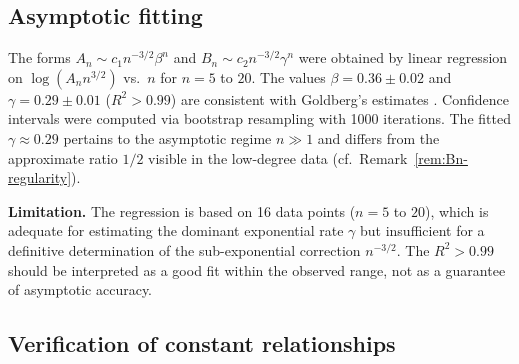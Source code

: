 \documentclass[10pt]{amsart}
\theoremstyle{definition}
\theoremstyle{remark}
\numberwithin{equation}{section}
\begin{document}
\subsection{Asymptotic fitting}

The forms $A_n \sim c_1 n^{-3/2} \beta^n$ and $B_n \sim c_2 n^{-3/2} \gamma^n$ were
obtained by linear regression on $\log(A_n n^{3/2})$ vs.\ $n$ for $n=5$ to $20$.  The
values $\beta = 0.36 \pm 0.02$ and $\gamma = 0.29 \pm 0.01$ ($R^2 > 0.99$) are
consistent with Goldberg's estimates \cite{Goldberg1956}.  Confidence intervals were
computed via bootstrap resampling with 1000 iterations.  The fitted $\gamma \approx 0.29$
pertains to the asymptotic regime $n \gg 1$ and differs from the approximate ratio
$1/2$ visible in the low-degree data (cf.\ Remark~\ref{rem:Bn-regularity}).

\textbf{Limitation.}  The regression is based on 16 data points ($n=5$ to $20$), which
is adequate for estimating the dominant exponential rate $\gamma$ but insufficient for a
definitive determination of the sub-exponential correction $n^{-3/2}$.  The $R^2 > 0.99$
should be interpreted as a good fit within the observed range, not as a guarantee of
asymptotic accuracy.

\subsection{Verification of constant relationships}
\end{document}
